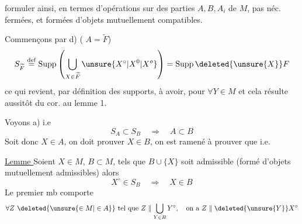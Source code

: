 
formuler ainsi, en termes d'opérations sur des parties $A,B,A_i$ de $M$, pas néc. fermées, et formées d'objets mutuellement compatibles.

Commençons par d) ( $A=\widetilde F$)
\[
S_{\widetilde F}\overset{\mathrm{def}}=\operatorname{Supp}\left(\bigcup_{X\in\widetilde F}\unsure{X^\circ|X^0|X^o}\right)=\operatorname{Supp}\deleted{\unsure{X}}F
\]
ce qui revient, par définition des supports, à avoir, pour $\forall Y\in M$
et cela résulte aussitôt du cor. au lemme 1.

Voyons a) i.e
\[
S_A\subset S_B\quad\Rightarrow\quad A\subset B
\]
Soit donc $X\in A$, on doit prouver $X\in B$, on est ramené à prouver que
i.e.

\uline{Lemme } Soient $X\in M$, $B\subset M$, tels que $B\cup\{X\}$ soit admissible (formé d'objets mutuellement admissibles) alors
\[
X^\circ\in S_B\quad\Rightarrow\quad X\in B
\]
Le premier mb  comporte
\[
\forall Z\ \deleted{\unsure{\in M|\in A}}\text{ tel que }Z\parallel\bigcup_{Y\in B}Y^\circ,\quad\text{on a }Z\parallel\deleted{\unsure{Y}}X^\circ
\]
